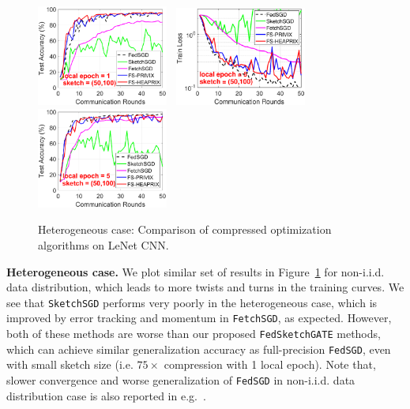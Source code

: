 \documentclass{article}
\begin{document}
\begin{figure}[t]
\begin{center}
{		\includegraphics[width=1.7in]{MNIST_figures/local1_sketch50_iid0_test_acc.eps} 
		}
		\mbox{\hspace{-0.15in}	
		\includegraphics[width=1.7in]{MNIST_figures/local5_sketch50_iid0_train_loss.eps}\hspace{-0.12in}
		\includegraphics[width=1.7in]{MNIST_figures/local5_sketch50_iid0_test_acc.eps}
		}
	\end{center}
	\vspace{-0.1in}
	\caption{Heterogeneous case: Comparison of compressed optimization algorithms on LeNet CNN.}
    \label{fig:MNIST-iid0}
    \vspace{-0.1in}
\end{figure}

\textbf{Heterogeneous case.} We plot similar set of results in Figure~\ref{fig:MNIST-iid0} for non-i.i.d. data distribution, which leads to more twists and turns in the training curves. 
We see that \texttt{SketchSGD} performs very poorly in the heterogeneous case, which is improved by error tracking and momentum in \texttt{FetchSGD}, as expected. However, both of these methods are worse than our proposed \texttt{FedSketchGATE} methods, which can achieve similar generalization accuracy as full-precision \texttt{FedSGD}, even with small sketch size (i.e. $75\times$ compression with 1 local epoch). 
Note that, slower convergence and worse generalization of \texttt{FedSGD} in non-i.i.d. data distribution case is also reported in e.g.~\citet{mcmahan2016communication,chen2020toward}. 
\end{document}
